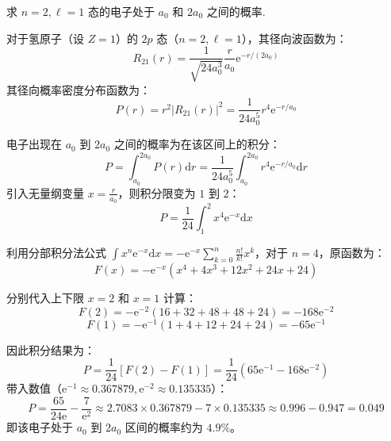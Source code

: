 \begin{exercise}\label{ex:25.6}
求 $n=2, \ell=1$ 态的电子处于 $a_0$ 和 $2a_0$ 之间的概率.
\end{exercise}
\begin{solution}
对于氢原子（设 $Z=1$）的 $2p$ 态（$n=2, \ell=1$），其径向波函数为：
$$ R_{21}(r) = \frac{1}{\sqrt{24 a_0^3}} \frac{r}{a_0} \mathrm{e}^{-r/(2a_0)} $$
其径向概率密度分布函数为：
$$ P(r) = r^2 |R_{21}(r)|^2 = \frac{1}{24 a_0^5} r^4 \mathrm{e}^{-r/a_0} $$

电子出现在 $a_0$ 到 $2a_0$ 之间的概率为在该区间上的积分：
$$ P = \int_{a_0}^{2a_0} P(r) \mathrm{d}r = \frac{1}{24 a_0^5} \int_{a_0}^{2a_0} r^4 \mathrm{e}^{-r/a_0} \mathrm{d}r $$
引入无量纲变量 $x = \frac{r}{a_0}$，则积分限变为 $1$ 到 $2$：
$$ P = \frac{1}{24} \int_1^2 x^4 \mathrm{e}^{-x} \mathrm{d}x $$

利用分部积分法公式 $\int x^n \mathrm{e}^{-x} \mathrm{d}x = - \mathrm{e}^{-x} \sum_{k=0}^n \frac{n!}{k!} x^k$，对于 $n=4$，原函数为：
$$ F(x) = -\mathrm{e}^{-x} \left( x^4 + 4x^3 + 12x^2 + 24x + 24 \right) $$

分别代入上下限 $x=2$ 和 $x=1$ 计算：
$$ F(2) = -\mathrm{e}^{-2} (16 + 32 + 48 + 48 + 24) = -168 \mathrm{e}^{-2} $$
$$ F(1) = -\mathrm{e}^{-1} (1 + 4 + 12 + 24 + 24) = -65 \mathrm{e}^{-1} $$

因此积分结果为：
$$ P = \frac{1}{24} \left[ F(2) - F(1) \right] = \frac{1}{24} \left( 65 \mathrm{e}^{-1} - 168 \mathrm{e}^{-2} \right) $$
带入数值（$\mathrm{e}^{-1} \approx 0.367879, \mathrm{e}^{-2} \approx 0.135335$）：
$$ P = \frac{65}{24\mathrm{e}} - \frac{7}{\mathrm{e}^2} \approx 2.7083 \times 0.367879 - 7 \times 0.135335 \approx 0.996 - 0.947 = 0.049 $$
即该电子处于 $a_0$ 到 $2a_0$ 区间的概率约为 $4.9\%$。
\end{solution}

